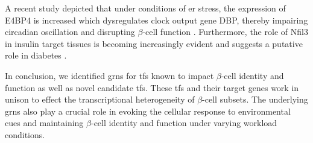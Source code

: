 A recent study depicted that under conditions of \gls{er} stress, the expression of E4BP4 is increased which dysregulates clock output gene DBP, thereby impairing circadian oscillation and disrupting $\beta$-cell function \textbf{\cite{ohta_clock_2017}}. Furthermore, the role of Nfil3 in insulin target tissues is becoming increasingly evident and suggests a putative role in diabetes \textbf{\cite{keniry_new_2014}}.\\


\par In conclusion, we identified \glspl{grn} for \glspl{tf} known to impact $\beta$-cell identity and function as well as novel candidate \glspl{tf}. These \glspl{tf} and their target genes work in unison to effect the transcriptional heterogeneity of $\beta$-cell subsets. The underlying \glspl{grn} also play a crucial role in evoking the cellular response to environmental cues and maintaining $\beta$-cell identity and function under varying workload conditions.



